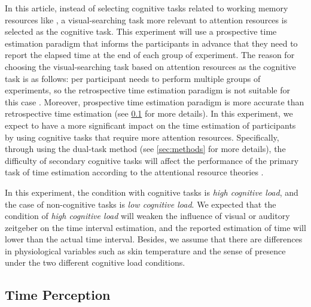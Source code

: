 \documentclass[sigconf]{acmart}
\begin{document}
In this article, instead of selecting cognitive tasks related to working memory resources like \cite{schatzschneider2016turned}, a visual-searching task more relevant to attention resources is selected as the cognitive task. This experiment will use a prospective time estimation paradigm that informs the participants in advance that they need to report the elapsed time at the end of each group of experiment. The reason for choosing the visual-searching task based on attention resources as the cognitive task is as follows: per participant needs to perform multiple groups of experiments, so the retrospective time estimation paradigm is not suitable for this case \cite{block1997prospective}. Moreover, prospective time estimation paradigm is more accurate than retrospective time estimation \cite{杨珍2006时距估计范式与方法效应的实验研究} (see \ref{sec:timeperception} for more details). In this experiment, we expect to have a more significant impact on the time estimation of participants by using cognitive tasks that require more attention resources. Specifically, through using the dual-task method (see \ref{sec:methods} for more details), the difficulty of secondary cognitive tasks will affect the performance of the primary task of time estimation according to the attentional resource theories \cite{kahneman1973attention,navon1979economy, Wickens1980processing}.


In this experiment, the condition with cognitive tasks is \emph{high cognitive load}, and the case of non-cognitive tasks is \emph{low cognitive load}. We expected that the condition of \emph{high cognitive load} will weaken the influence of visual or auditory zeitgeber on the time interval estimation, and the reported estimation of time will lower than the actual time interval. Besides, we assume that there are differences in physiological variables such as skin temperature and the sense of presence under the two different cognitive load conditions.

\subsection{Time Perception}\label{sec:timeperception}
\end{document}

